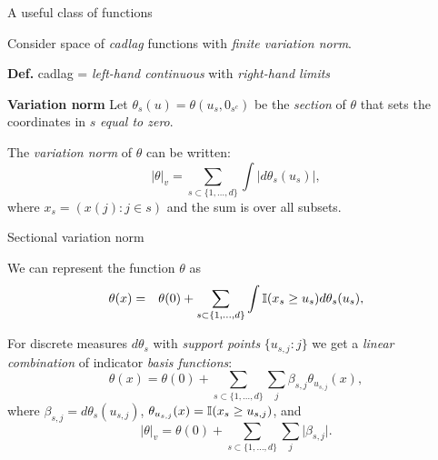 \documentclass{beamer}
\begin{document}
\begin{frame}{A useful class of functions}
\vspace{0.75cm}

Consider space of \textit{cadlag} functions with \textit{finite variation
norm}.

\textbf{Def.} cadlag = \textit{left-hand continuous} with
\textit{right-hand limits}
\vspace{0.25cm}

\textbf{Variation norm}
Let $\theta_s(u)=\theta(u_s,0_{s^c})$ be the \textit{section} of $\theta$ that
sets the coordinates in $s$ \textit{equal to zero}.
\vspace{0.15cm}

The \textit{variation norm} of $\theta$ can be written:
\[
  \lvert \theta \rvert_v=\sum_{s\subset\{1,\dots,d\}}\int \mid
  d\theta_s(u_s)\mid ,
\]
where $x_s=(x(j):j\in s)$ and the sum is over all subsets.

\note{
}

\end{frame}


\begin{frame}{Sectional variation norm}

We can represent the function $\theta$ as
\begin{eqnarray*}
\theta(x)&=&\theta(0) + \sum_{s\subset\{1,\ldots,d\}}
  \int \mathbb{I}(x_s\geq u_s)d\theta_s(u_s),
\end{eqnarray*}

For discrete measures $d\theta_s$ with \textit{support points} $\{u_{s,j}:j\}$
we get a \textit{linear combination} of indicator \textit{basis functions}:
\[
  \theta(x) = \theta(0) + \sum_{s\subset\{1,\ldots,d\}}\sum_{j} \beta_{s,j}
    \theta_{u_{s,j}}(x),
\]
where $\beta_{s,j}=d\theta_s(u_{s,j})$,
$\theta_{u_{s,j}}(x) = \mathbb{I}(x_s \ge u_{s,j})$,
and
\begin{equation*}
\lvert \theta \rvert_v = \theta(0) + \sum_{s\subset\{1,\ldots,d\}}
  \sum_j \lvert \beta_{s,j} \rvert.
\end{equation*}

\note{
}

\end{frame}

\end{document}
